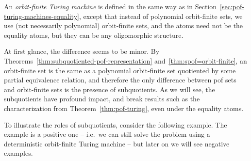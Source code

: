  \begin{definition}
	\label{def:of-turing-machine}  An \emph{orbit-finite Turing machine} is defined in the same way as in Section~\ref{sec:pof-turing-machines-equality}, except that instead of polynomial orbit-finite sets, we use (not necessarily polynomial) orbit-finite sets, and the  atoms need not be the equality atoms, but they can be any oligomorphic structure.
 \end{definition}

 
 At first glance, the difference  seems to be minor. By Theorems~\ref{thm:subquotiented-pof-representation} and~\ref{thm:spof=orbit-finite}, an orbit-finite set is the same as a polynomial orbit-finite set quotiented by  some partial equivalence relation, and therefore the only difference between pof sets and orbit-finite sets is the presence of subquotients.  As we will see, the subquotients  have profound impact, and break results such as the characterization from Theorem~\ref{thm:pof-turing}, even under the equality atoms. 

 To illustrate the roles of subquotients, consider the following example. The example is a positive one -- i.e.~we can still solve the problem using a deterministic orbit-finite Turing machine -- but later on we will see negative examples. 






